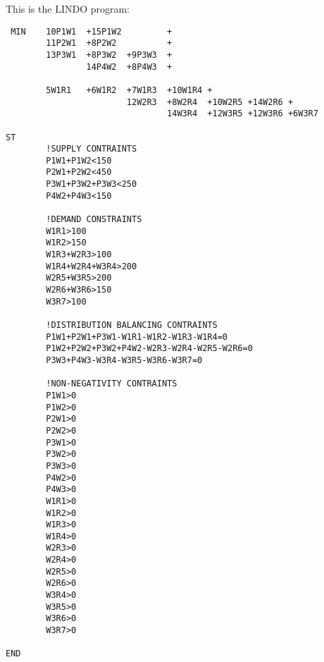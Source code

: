 This is the LINDO program:\\
\begin{verbatim}
 MIN    10P1W1  +15P1W2         +
        11P2W1  +8P2W2          +
        13P3W1  +8P3W2  +9P3W3  +
                14P4W2  +8P4W3  +
        
        5W1R1   +6W1R2  +7W1R3  +10W1R4 +
                        12W2R3  +8W2R4  +10W2R5 +14W2R6 +
                                14W3R4  +12W3R5 +12W3R6 +6W3R7

ST
        !SUPPLY CONTRAINTS
        P1W1+P1W2<150
        P2W1+P2W2<450
        P3W1+P3W2+P3W3<250
        P4W2+P4W3<150

        !DEMAND CONSTRAINTS
        W1R1>100
        W1R2>150
        W1R3+W2R3>100
        W1R4+W2R4+W3R4>200
        W2R5+W3R5>200
        W2R6+W3R6>150
        W3R7>100        

        !DISTRIBUTION BALANCING CONTRAINTS
        P1W1+P2W1+P3W1-W1R1-W1R2-W1R3-W1R4=0
        P1W2+P2W2+P3W2+P4W2-W2R3-W2R4-W2R5-W2R6=0
        P3W3+P4W3-W3R4-W3R5-W3R6-W3R7=0

        !NON-NEGATIVITY CONTRAINTS
        P1W1>0
        P1W2>0
        P2W1>0
        P2W2>0
        P3W1>0
        P3W2>0
        P3W3>0
        P4W2>0
        P4W3>0
        W1R1>0
        W1R2>0
        W1R3>0
        W1R4>0
        W2R3>0
        W2R4>0
        W2R5>0
        W2R6>0
        W3R4>0
        W3R5>0
        W3R6>0
        W3R7>0

END
\end{verbatim}

